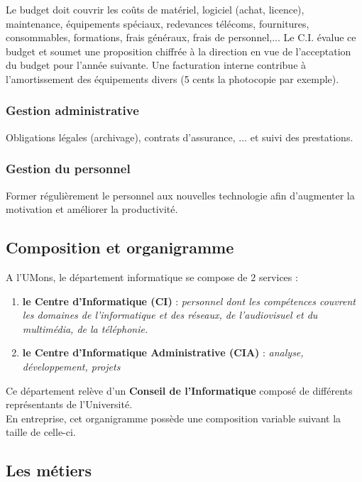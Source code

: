 \documentclass[10pt,a4paper,oneside,titlepage]{report}
\newcommand{\firebrick}[1]{\textcolor{firebrick4}{#1}}
\newcommand{\titre}[1]{\textcolor{title}{#1}}
\newcommand{\newterm}[1]{\textit{#1}}
\newcommand{\strong}[1]{\textbf{\titre{#1}}}
\begin{document}
\begin{sffamily}
Le budget doit couvrir les coûts de matériel, logiciel (achat, licence), maintenance, équipements spéciaux, redevances télécoms, fournitures, consommables, formations, 
frais généraux, frais de personnel,... Le C.I. évalue ce budget et soumet une proposition chiffrée à la direction en vue de l'acceptation du budget pour l'année suivante.
Une facturation interne contribue à l'amortissement des équipements divers (5 cents la photocopie par exemple).

\subsubsection{Gestion administrative}

Obligations légales (archivage), contrats d'assurance, ... et suivi des prestations.

\subsubsection{Gestion du personnel}

Former régulièrement le personnel aux nouvelles technologie afin d'augmenter la motivation et améliorer la productivité.

\subsection{Composition et organigramme}

\noindent A l'UMons, le département informatique se compose de $2$ services :
\begin{enumerate}
\item \textbf{\strong{le Centre d'Informatique} (\firebrick{CI})} : \newterm{personnel dont les compétences couvrent les domaines de l'informatique et des réseaux, de 
l'audiovisuel et du multimédia, de la téléphonie.}
\item \textbf{\strong{le Centre d'Informatique Administrative} (\firebrick{CIA})} : \newterm{analyse, développement, projets}
\end{enumerate}
Ce département relève d'un \strong{Conseil de l'Informatique} composé de différents représentants de l'Université.\\
En entreprise, cet organigramme possède une composition variable suivant la taille de celle-ci.

\subsection{Les métiers}


\end{sffamily}
\end{document}

